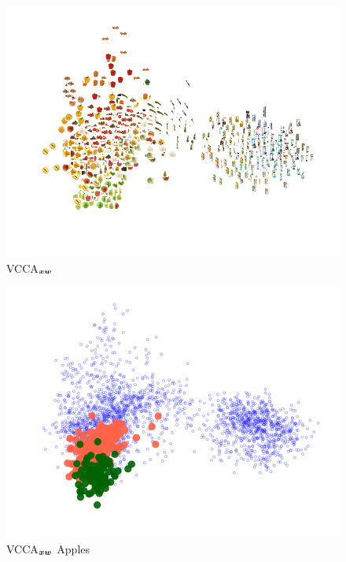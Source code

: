 \begin{subfigure}[b]{0.3\textwidth}
	\centering
	\includegraphics[width=\textwidth]{Chapter1/pics_paperB/pca_latents_vcca_xw_seed2}
	\caption{VCCA$_{{\bm{x}}{\bm{w}}}$}
	\label{fig:pca_latents_vcca_xw}
\end{subfigure}
\hfill
\begin{subfigure}[b]{0.3\textwidth}
	\centering
	\includegraphics[width=\textwidth]{Chapter1/pics_paperB/pca_latents_apples_vcca_xw_seed2}
	\caption{VCCA$_{{\bm{x}}{\bm{w}}}$ Apples}
	\label{fig:pca_latents_vcca_xw_apples}
\end{subfigure}
\hfill
